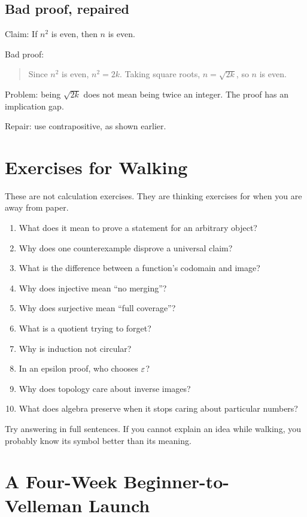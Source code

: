 \documentclass[11pt]{article}
\begin{document}
\subsection{Bad proof, repaired}

Claim: If $n^2$ is even, then $n$ is even.

Bad proof:

\begin{quote}
Since $n^2$ is even, $n^2=2k$. Taking square roots, $n=\sqrt{2k}$, so $n$ is even.
\end{quote}

Problem: being $\sqrt{2k}$ does not mean being twice an integer. The proof has an implication gap.

Repair: use contrapositive, as shown earlier.

\newpage
\section{Exercises for Walking}

These are not calculation exercises. They are thinking exercises for when you are away from paper.

\begin{enumerate}
\item What does it mean to prove a statement for an arbitrary object?
\item Why does one counterexample disprove a universal claim?
\item What is the difference between a function's codomain and image?
\item Why does injective mean ``no merging''?
\item Why does surjective mean ``full coverage''?
\item What is a quotient trying to forget?
\item Why is induction not circular?
\item In an epsilon proof, who chooses $\varepsilon$?
\item Why does topology care about inverse images?
\item What does algebra preserve when it stops caring about particular numbers?
\end{enumerate}

Try answering in full sentences. If you cannot explain an idea while walking, you probably know its symbol better than its meaning.

\newpage
\section{A Four-Week Beginner-to-Velleman Launch}
\end{document}
